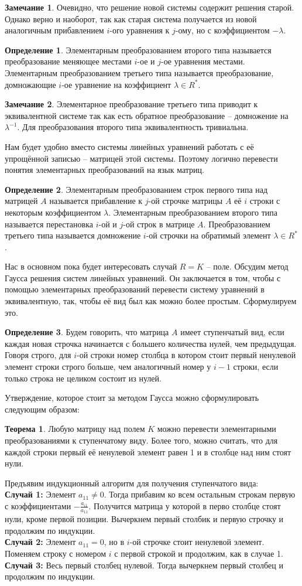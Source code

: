 \documentclass[10pt,a4paper,oneside]{book}
\theoremstyle{definition}
\newtheorem*{rem}{Замечание}
\newtheorem{defn}{Определение}
\newtheorem{thm}{Теорема}
\def\thrm{\begin{thm}}
\def\ethrm{\end{thm}}
\def\dfn{\begin{defn}}
\def\edfn{\end{defn}}
\def\rm{\begin{rem}}
\def\erm{\end{rem}}
\begin{document}
\rm Очевидно, что решение новой системы содержит решения старой. Однако верно и наоборот, так как старая система получается из новой аналогичным прибавлением $i$-ого уравнения к $j$-ому, но с коэффициентом $-\lambda$.
\erm 

\dfn Элементарным преобразованием второго типа называется преобразование меняющее местами $i$-ое и $j$-ое уравнения местами. Элементарным преобразованием третьего типа называется преобразование, домножающие $i$-ое уравнение на коэффициент $\lambda \in R^*$.
\edfn

\rm Элементарное преобразование третьего типа приводит к эквивалентной системе так как есть обратное преобразование -- домножение на $\lambda^{-1}$. Для преобразования второго типа эквивалентность тривиальна.
\erm

Нам будет удобно вместо системы линейных уравнений работать с её упрощённой записью -- матрицей этой системы. Поэтому логично перевести понятия элементарных преобразований на язык матриц.

\dfn Элементарным преобразованием строк первого типа над матрицей $A$ называется прибавление к $j$-ой строчке матрицы $A$ её $i$ строки с некоторым коэффициентом $\lambda$. Элементарным преобразованием второго типа называется перестановка $i$-ой и $j$-ой строк в матрице $A$. Преобразованием третьего типа называется домножение $i$-ой строчки на обратимый элемент $\lambda \in R^*$.
\edfn

Нас в основном пока будет интересовать случай $R=K$ -- поле. Обсудим метод Гаусса решения систем линейных уравнений. Он заключается в том, чтобы с помощью элементарных преобразований перевести систему уравнений в эквивалентную, так, чтобы её вид был как можно более простым. Сформулируем это.

\dfn Будем говорить, что матрица $A$ имеет ступенчатый вид, если каждая новая строчка начинается с большего количества нулей, чем предыдущая. Говоря строго, для $i$-ой строки номер столбца в котором стоит первый ненулевой элемент строки строго больше, чем аналогичный  номер у $i-1$ строки, если только строка не целиком состоит из нулей.  
\edfn

Утверждение, которое стоит за методом Гаусса можно сформулировать следующим образом:

\thrm Любую матрицу над полем $K$ можно перевести элементарными преобразованиями к ступенчатому виду. Более того, можно считать, что для каждой строки первый её ненулевой элемент равен 1 и в столбце над ним стоят нули.
\ethrm
Предъявим индукционный алгоритм для получения ступенчатого вида:\\
{\bf Случай 1:} Элемент $a_{11}\neq 0$. Тогда прибавим ко всем остальным строкам первую с коэффициентами $-\frac{a_{i1}}{a_{11}}$. Получится матрица у которой в перво столбце стоят нули, кроме первой позиции. Вычеркнем первый столбик и первую строчку и продолжим по индукции.\\
{\bf Случай 2:} Элемент $a_{11}=0$, но в $i$-ой строчке стоит ненулевой элемент. Поменяем строку с номером $i$ с первой строкой и продолжим, как в случае 1.\\
{\bf Случай 3:} Весь первый столбец нулевой. Тогда вычеркнем первый столбец и продолжим по индукции.
\end{document}
